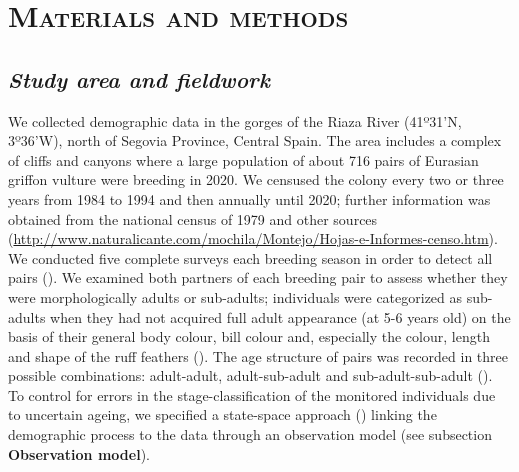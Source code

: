\documentclass[12pt]{article}
\begin{document}
\section*{\textsc{Materials and methods}}

\subsection*{\textit{Study area and fieldwork}}
We collected demographic data in the gorges of the Riaza River (41º31'N, 3º36'W), north of Segovia Province, Central Spain. The area includes a complex of cliffs and canyons where a large population of about 716 pairs of Eurasian griffon vulture were breeding in 2020. We censused the colony every two or three years from 1984 to 1994 and then annually until 2020; further information was obtained from the national census of 1979 and other sources (\url{http://www.naturalicante.com/mochila/Montejo/Hojas-e-Informes-censo.htm}). We conducted five complete surveys each breeding season in order to detect all pairs (\cite{Martinez1997}). We examined both partners of each breeding pair to assess whether they were morphologically adults or sub-adults; individuals were categorized as sub-adults when they had not acquired full adult appearance (at 5-6 years old) on the basis of their general body colour, bill colour and, especially the colour, length and shape of the ruff feathers (\cite{Elosegui1989,Blanco1996,Duriez2011a}). The age structure of pairs was recorded in three possible combinations: adult-adult, adult-sub-adult and sub-adult-sub-adult (\cite{Blanco1996,Blanco1997}). To control for errors in the stage-classification of the monitored individuals due to uncertain ageing, we specified a state-space approach (\cite{King2010}) linking the demographic process to the data through an observation model (see subsection \textbf{Observation model}).\\
\end{document}
